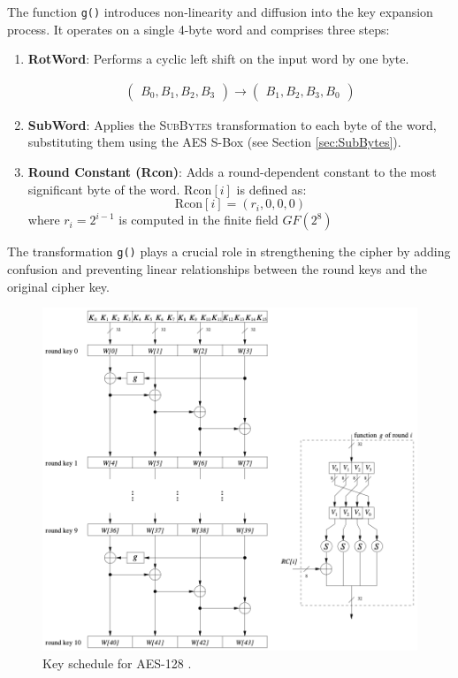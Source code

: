 The function \texttt{g()} introduces non-linearity and diffusion into the key expansion process. 
It operates on a single 4-byte word and comprises three steps:
\begin{enumerate}
    \item \textbf{RotWord}: Performs a cyclic left shift on the input word by one byte.
    
    \begin{align}
        \begin{pmatrix}
            B_0, B_1, B_2, B_3
        \end{pmatrix}
        \rightarrow
        \begin{pmatrix}
            B_1, B_2, B_3, B_0
        \end{pmatrix}
    \end{align}

    \item \textbf{SubWord}: Applies the \textsc{SubBytes} transformation to each byte of the word, substituting them using the AES S-Box (see Section \ref{sec:SubBytes}).
    
    \item \textbf{Round Constant (Rcon)}: Adds a round-dependent constant to the most significant byte of the word. 
    $\text{Rcon}[i]$ is defined as:
    \begin{equation}
        \text{Rcon}[i] = (r_i, 0, 0, 0)
    \end{equation}
    where $r_i = 2^{i-1}$ is computed in the finite field $GF(2^8)$
\end{enumerate}

The transformation \texttt{g()} plays a crucial role in strengthening the cipher by adding confusion and preventing linear relationships between the round keys and the original cipher key.

\begin{figure}[!ht]
    \centering
    \includegraphics[width=\textwidth]{img/key-schedule-128.png}
    \caption{Key schedule for AES-128 \cite{Paar2024}.}
    \label{fig:key-schedule-128}
\end{figure}


